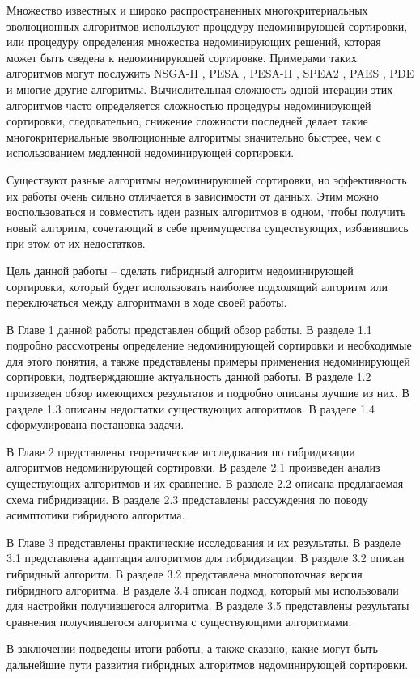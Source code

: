 \startprefacepage

Множество известных и широко распространенных многокритериальных эволюционных алгоритмов используют процедуру недоминирующей сортировки, или процедуру определения множества недоминирующих решений, которая может быть сведена к недоминирующей сортировке. Примерами таких алгоритмов могут послужить NSGA-II \cite{NSGA-II}, PESA \cite{PESA}, PESA-II \cite{PESA-II}, SPEA2 \cite{SPEA2}, PAES \cite{PAES}, PDE \cite{PDE} и многие другие алгоритмы. Вычислительная сложность одной итерации этих алгоритмов часто определяется сложностью процедуры недоминирующей сортировки, следовательно, снижение сложности последней делает такие многокритериальные эволюционные алгоритмы значительно быстрее, чем с использованием медленной недоминирующей сортировки.

Существуют разные алгоритмы недоминирующей сортировки, но эффективность их работы очень сильно отличается в зависимости от данных. Этим можно воспользоваться и совместить идеи разных алгоритмов в одном, чтобы получить новый алгоритм, сочетающий в себе преимущества существующих, избавившись при этом от их недостатков.

Цель данной работы -- сделать гибридный алгоритм недоминирующей сортировки, который будет использовать наиболее подходящий алгоритм или переключаться между алгоритмами в ходе своей работы.

В Главе 1 данной работы представлен общий обзор работы. 
В разделе 1.1 подробно рассмотрены определение недоминирующей сортировки и необходимые для этого понятия, а также представлены примеры применения недоминирующей сортировки, подтверждающие актуальность данной работы. 
В разделе 1.2 произведен обзор имеющихся результатов и подробно описаны лучшие из них. 
В разделе 1.3 описаны недостатки существующих алгоритмов. 
В разделе 1.4 сформулирована постановка задачи.

В Главе 2 представлены теоретические исследования по гибридизации алгоритмов недоминирующей сортировки. 
В разделе 2.1 произведен анализ существующих алгоритмов и их сравнение. 
В разделе 2.2 описана предлагаемая схема гибридизации. 
В разделе 2.3 представлены рассуждения по поводу асимптотики гибридного алгоритма.

В Главе 3 представлены практические исследования и их результаты. 
В разделе 3.1 представлена адаптация алгоритмов для гибридизации. 
В разделе 3.2 описан гибридный алгоритм.
В разделе 3.2 представлена многопоточная версия гибридного алгоритма.
В разделе 3.4 описан подход, который мы использовали для настройки получившегося алгоритма.
В разделе 3.5 представлены результаты сравнения получившегося алгоритма с существующими алгоритмами. 

В заключении подведены итоги работы, а также сказано, какие могут быть дальнейшие пути развития гибридных алгоритмов недоминирующей сортировки.
